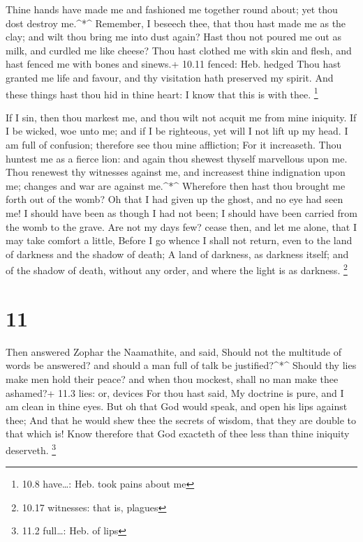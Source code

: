  Thine hands have made me and fashioned me together round
about; yet thou dost destroy me.\^{}*\^{}  Remember, I
beseech thee, that thou hast made me as the clay; and wilt thou bring me
into dust again?  Hast thou not poured me out as milk, and
curdled me like cheese?  Thou hast clothed me with skin and
flesh, and hast fenced me with bones and sinews.+ 10.11 fenced: Heb.
hedged  Thou hast granted me life and favour, and thy
visitation hath preserved my spirit.  And these things hast
thou hid in thine heart: I know that this is with thee. \footnote{10.8
  have\ldots: Heb. took pains about me}

 If I sin, then thou markest me, and thou wilt not acquit
me from mine iniquity.  If I be wicked, woe unto me; and if
I be righteous, yet will I not lift up my head. I am full of confusion;
therefore see thou mine affliction;  For it increaseth.
Thou huntest me as a fierce lion: and again thou shewest thyself
marvellous upon me.  Thou renewest thy witnesses against
me, and increasest thine indignation upon me; changes and war are
against me.\^{}*\^{}  Wherefore then hast thou brought me
forth out of the womb? Oh that I had given up the ghost, and no eye had
seen me!  I should have been as though I had not been; I
should have been carried from the womb to the grave.  Are
not my days few? cease then, and let me alone, that I may take comfort a
little,  Before I go whence I shall not return, even to the
land of darkness and the shadow of death;  A land of
darkness, as darkness itself; and of the shadow of death, without any
order, and where the light is as darkness. \footnote{10.17 witnesses:
  that is, plagues}

\hypertarget{section-10}{%
\section{11}\label{section-10}}

 Then answered Zophar the Naamathite, and said, 
Should not the multitude of words be answered? and should a man full of
talk be justified?\^{}*\^{}  Should thy lies make men hold
their peace? and when thou mockest, shall no man make thee ashamed?+
11.3 lies: or, devices  For thou hast said, My doctrine is
pure, and I am clean in thine eyes.  But oh that God would
speak, and open his lips against thee;  And that he would
shew thee the secrets of wisdom, that they are double to that which is!
Know therefore that God exacteth of thee less than thine iniquity
deserveth. \footnote{11.2 full\ldots: Heb. of lips}

